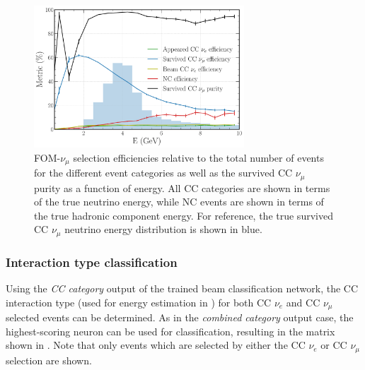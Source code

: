 \begin{figure} %
    \includegraphics[width=0.7\textwidth]{diagrams/7-results/final_numu_hists.pdf}
    \caption[Efficiency of the CC $\nu_{\mu}$ selection as a function of energy]
    {FOM-$\nu_{\mu}$ selection efficiencies relative to the total number of events for the
        different event categories as well as the survived CC $\nu_{\mu}$ purity as a function of
        energy. All CC categories are shown in terms of the true neutrino energy, while NC events
        are shown in terms of the true hadronic component energy. For reference, the true survived
        CC $\nu_{\mu}$ neutrino energy distribution is shown in blue.}
    \label{fig:final_numu_hists}
\end{figure}

\subsubsection*{Interaction type classification} %

Using the \emph{CC category} output of the trained beam classification network, the CC interaction
type (used for energy estimation in ) for both CC $\nu_{e}$
and CC $\nu_{\mu}$ selected events can be determined. As in the \emph{combined category} output
case, the highest-scoring neuron can be used for classification, resulting in the matrix shown in
. Note that only events which are selected by either the CC
$\nu_{e}$ or CC $\nu_{\mu}$ selection are shown.

